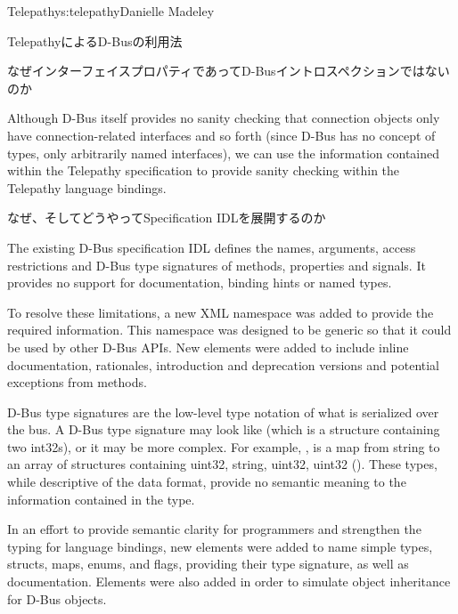 \begin{aosachapter}{Telepathy}{s:telepathy}{Danielle Madeley}
\begin{aosasect1}{TelepathyによるD-Busの利用法}
\begin{aosabox}{なぜインターフェイスプロパティであってD-Busイントロスペクションではないのか}
\end{aosabox}

Although D-Bus itself provides no sanity checking that connection
objects only have connection-related interfaces and so forth (since
D-Bus has no concept of types, only arbitrarily named interfaces), we
can use the information contained within the Telepathy specification
to provide sanity checking within the Telepathy language bindings.

\begin{aosabox}{なぜ、そしてどうやってSpecification IDLを展開するのか}

The existing D-Bus specification IDL defines the names, arguments,
access restrictions and D-Bus type signatures of methods, properties
and signals. It provides no support for documentation, binding hints
or named types.

To resolve these limitations, a new XML namespace was added to provide
the required information. This namespace was designed to be generic so
that it could be used by other D-Bus APIs. New elements were added to
include inline documentation, rationales, introduction and deprecation
versions and potential exceptions from methods.

D-Bus type signatures are the low-level type notation of what is
serialized over the bus. A D-Bus type signature may look like
 (which is a structure containing two int32s), or it may be
more complex.  For example, , is a map from string
to an array of structures containing uint32, string, uint32, uint32
().  These types, while
descriptive of the data format, provide no semantic meaning to the
information contained in the type.

In an effort to provide semantic clarity for programmers and
strengthen the typing for language bindings, new elements were added
to name simple types, structs, maps, enums, and flags, providing their
type signature, as well as documentation.  Elements were also added in
order to simulate object inheritance for D-Bus objects.

\end{aosabox}



\end{aosasect1}
\end{aosachapter}
